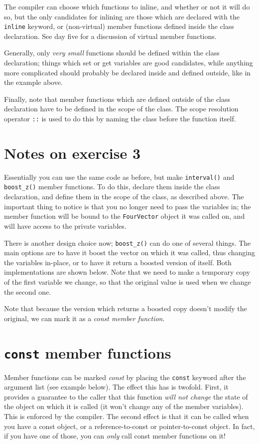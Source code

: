 \documentclass[a4paper]{scrartcl}
\begin{document}
The compiler can choose which functions to inline, and whether or not it will do so, but the only candidates for inlining are those which are declared with the \verb|inline| keyword, or (non-virtual) member functions defined inside the class declaration. See day five for a discussion of virtual member functions.

Generally, only \emph{very small} functions should be defined within the class declaration; things which set or get variables are good candidates, while anything more complicated should probably be declared inside and defined outside, like in the example above.

Finally, note that member functions which are defined outside of the class declaration have to be defined in the scope of the class. The scope resolution operator \verb|::| is used to do this by naming the class before the function itself.



\section{Notes on exercise 3}
Essentially you can use the same code as before, but make \verb|interval()| and \verb|boost_z()| member functions. To do this, declare them inside the class declaration, and define them in the scope of the class, as described above. The important thing to notice is that you no longer need to pass the variables in; the member function will be bound to the \verb|FourVector| object it was called on, and will have access to the private variables.

There is another design choice now; \verb|boost_z()| can do one of several things. The main options are to have it boost the vector on which it was called, thus changing the variables in-place, or to have it return a boosted version of itself. Both implementations are shown below. Note that we need to make a temporary copy of the first variable we change, so that the original value is used when we change the second one.




Note that because the version which returns a boosted copy doesn't modify the original, we can mark it as a \emph{const member function}.

\section{\texttt{const} member functions}
Member functions can be marked \emph{const} by placing the \verb|const| keyword after the argument list (see example below). The effect this has is twofold. First, it provides a guarantee to the caller that this function \emph{will not change} the state of the object on which it is called (it won't change any of the member variables). This is enforced by the compiler. The second effect is that it can be called when you have a const object, or a reference-to-const or pointer-to-const object. In fact, if you have one of those, you can \emph{only} call const member functions on it!
\end{document}
